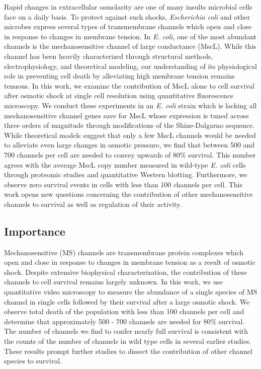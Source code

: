 Rapid
changes
in
extracellular
osmolarity
are
one of
many
insults
microbial
cells
face
on a
daily
basis.
To
protect
against
such
shocks,
\emph{Escherichia
coli}
and
other
microbes
express
several
types
of
transmembrane
channels
which
open
and
close
in
response
to
changes
in
membrane
tension.
In
\emph{E.
coli},
one of
the
most
abundant
channels
is the
mechanosensitive
channel
of
large
conductance
(MscL).
While
this
channel
has
been
heavily
characterized
through
structural
methods,
electrophysiology,
and
theoretical
modeling,
our
understanding
of its
physiological
role
in
preventing
cell
death
by
alleviating
high
membrane
tension
remains
tenuous.
In
this
work,
we
examine
the
contribution
of
MscL
alone
to
cell
survival
after
osmotic
shock
at
single
cell
resolution
using
quantitative
fluorescence
microscopy.
We
conduct
these
experiments
in an
\emph{E.
coli}
strain
which
is
lacking
all
mechanosensitive
channel
genes
save
for
MscL
whose
expression
is
tuned
across
three
orders
of
magnitude
through
modifications
of the
Shine-Dalgarno
sequence.
While
theoretical
models
suggest
that
only a
few
MscL
channels
would
be
needed
to
alleviate
even
large
changes
in
osmotic
pressure,
we
find
that
between
500
and
700
channels
per
cell
are
needed
to
convey
upwards
of
80\%
survival.
This
number
agrees
with
the
average
MscL
copy
number
measured
in
wild-type
\emph{E.
coli}
cells
through
proteomic
studies
and
quantitative
Western
blotting.
Furthermore,
we
observe
zero
survival
events
in
cells
with
less
than
100
channels
per
cell.
This
work
opens
new
questions
concerning
the
contribution
of
other
mechanosensitive
channels
to
survival
as
well
as
regulation
of
their
activity.

\subsection{Importance}\label{importance}

Mechanosensitive
(MS)
channels
are
transmembrane
protein
complexes
which
open
and
close
in
response
to
changes
in
membrane
tension
as a
result
of
osmotic
shock.
Despite
extensive
biophysical
characterization,
the
contribution
of
these
channels
to
cell
survival
remains
largely
unknown.
In
this
work,
we use
quantitative
video
microscopy
to
measure
the
abundance
of a
single
species
of MS
channel
in
single
cells
followed
by
their
survival
after
a
large
osmotic
shock.
We
observe
total
death
of the
population
with
less
than
100
channels
per
cell
and
determine
that
approximately
500 -
700
channels
are
needed
for
80\%
survival.
The
number
of
channels
we
find
to
confer
nearly
full
survival
is
consistent
with
the
counts
of the
number
of
channels
in
wild
type
cells
in
several
earlier
studies.
These
results
prompt
further
studies
to
dissect
the
contribution
of
other
channel
species
to
survival.

